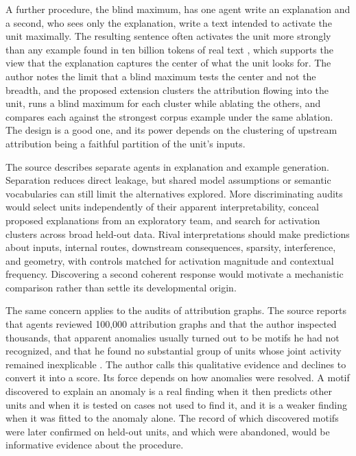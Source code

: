 \documentclass[11pt]{article}
\begin{document}
A further procedure, the blind maximum, has one agent write an explanation and a second, who sees only the explanation, write a text intended to activate the unit maximally. The resulting sentence often activates the unit more strongly than any example found in ten billion tokens of real text \cite[\emph{Explanations That Can Lose}]{cammarata}, which supports the view that the explanation captures the center of what the unit looks for. The author notes the limit that a blind maximum tests the center and not the breadth, and the proposed extension clusters the attribution flowing into the unit, runs a blind maximum for each cluster while ablating the others, and compares each against the strongest corpus example under the same ablation. The design is a good one, and its power depends on the clustering of upstream attribution being a faithful partition of the unit's inputs.

The source describes separate agents in explanation and example generation. Separation reduces direct leakage, but shared model assumptions or semantic vocabularies can still limit the alternatives explored. More discriminating audits would select units independently of their apparent interpretability, conceal proposed explanations from an exploratory team, and search for activation clusters across broad held-out data. Rival interpretations should make predictions about inputs, internal routes, downstream consequences, sparsity, interference, and geometry, with controls matched for activation magnitude and contextual frequency. Discovering a second coherent response would motivate a mechanistic comparison rather than settle its developmental origin.

The same concern applies to the audits of attribution graphs. The source reports that agents reviewed 100,000 attribution graphs and that the author inspected thousands, that apparent anomalies usually turned out to be motifs he had not recognized, and that he found no substantial group of units whose joint activity remained inexplicable \cite[\emph{Audits of Attribution Graphs}]{cammarata}. The author calls this qualitative evidence and declines to convert it into a score. Its force depends on how anomalies were resolved. A motif discovered to explain an anomaly is a real finding when it then predicts other units and when it is tested on cases not used to find it, and it is a weaker finding when it was fitted to the anomaly alone. The record of which discovered motifs were later confirmed on held-out units, and which were abandoned, would be informative evidence about the procedure.
\end{document}
